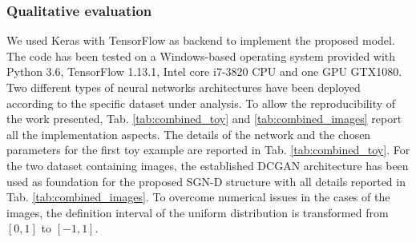 \subsubsection{Qualitative evaluation}
We used Keras with TensorFlow \cite{TensorFlow} as backend to implement the proposed model. The code has been tested on a Windows-based operating system provided with Python 3.6, TensorFlow 1.13.1, Intel core i7-3820 CPU and one GPU GTX1080. 
Two different types of neural networks architectures have been deployed according to the specific dataset under analysis. To allow the reproducibility of the work presented, Tab. \ref{tab:combined_toy} and \ref{tab:combined_images} report all the implementation aspects. The details of the network and the chosen parameters for the first toy example are reported in Tab. \ref{tab:combined_toy}. For the two dataset containing images, the established DCGAN \cite{Radford2016} architecture has been used as foundation for the proposed SGN-D structure with all details reported in Tab. \ref{tab:combined_images}. To overcome numerical issues in the cases of the images, the definition interval of the uniform distribution is transformed from $[0,1]$ to $[-1,1]$.

